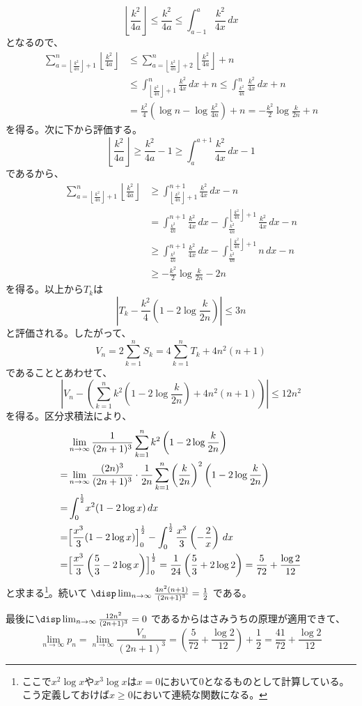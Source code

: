 \[ \left\lfloor \frac{k^2}{4a}\right\rfloor \le \frac{k^2}{4a} \le \int_{a-1}^a\! \frac{k^2}{4x} \,dx \]
となるので、
\begin{align*}
 \sum_{a=\left\lfloor\frac{k^2}{4n}\right\rfloor+1}^n \left\lfloor\frac{k^2}{4a}\right\rfloor &\le \sum_{a=\left\lfloor\frac{k^2}{4n}\right\rfloor+2}^n \left\lfloor\frac{k^2}{4a}\right\rfloor + n \\
 &\le \int_{\left\lfloor\frac{k^2}{4n}\right\rfloor+1}^n\frac{k^2}{4x}\,dx + n \le \int_{\frac{k^2}{4n}}^n\frac{k^2}{4x}\,dx + n \\
 &= \frac{k^2}{4}\left(\log n-\log\frac{k^2}{4n}\right)+n = -\frac{k^2}{2}\log\frac{k}{2n}+n
\end{align*}
を得る。次に下から評価する。
\[ \left\lfloor\frac{k^2}{4a}\right\rfloor\ge \frac{k^2}{4a}-1 \ge \int_a^{a+1}\!\frac{k^2}{4x}\,dx -1 \]
であるから、
\begin{align*}
 \sum_{a=\left\lfloor\frac{k^2}{4n}\right\rfloor+1}^n\left\lfloor\frac{k^2}{4a}\right\rfloor &\ge \int_{\left\lfloor\frac{k^2}{4n}\right\rfloor+1}^{n+1}\frac{k^2}{4x}\,dx -n \\
 &=\int_{\frac{k^2}{4n}}^{n+1}\frac{k^2}{4x}\,dx -\int_{\frac{k^2}{4n}}^{\left\lfloor\frac{k^2}{4n}\right\rfloor+1}\frac{k^2}{4x}\,dx -n \\
 &\ge\int_{\frac{k^2}{4n}}^{n+1}\frac{k^2}{4x}\,dx -\int_{\frac{k^2}{4n}}^{\left\lfloor\frac{k^2}{4n}\right\rfloor+1}n\,dx -n \\
 &\ge -\frac{k^2}{2}\log\frac{k}{2n}-2n
\end{align*}
を得る。以上から$T_k$は
\[ \left|T_k-\frac{k^2}{4}\left(1-2\log\frac{k}{2n}\right)\right| \le 3n \]
と評価される。したがって、
\[ V_n=2\sum_{k=1}^nS_k=4\sum_{k=1}^nT_k+4n^2(n+1) \]
であることとあわせて、
\[ \left|V_n-\left(\sum_{k=1}^nk^2\left(1-2\log\frac{k}{2n}\right)+4n^2(n+1)\right)\right| \le 12n^2 \]
を得る。区分求積法により、
\begin{align*}
 &\lim_{n\to\infty}\frac{1}{(2n+1)^3}\sum_{k=1}^nk^2\left(1-2\log\frac{k}{2n}\right) \\
 =& \lim_{n\to\infty}\frac{(2n)^3}{(2n+1)^3}\cdot\frac{1}{2n}\sum_{k=1}^n\left(\frac{k}{2n}\right)^2\left(1-2\log\frac{k}{2n}\right) \\
 =& \int_0^{\frac{1}{2}}\! x^2(1-2\log x) \,dx \\
 =& \Bigl[\frac{x^3}{3}(1-2\log x)\Bigr]^{\frac{1}{2}}_0-\int_0^{\frac{1}{2}}\frac{x^3}{3}\left(-\frac{2}{x}\right) \,dx \\
 =& \Bigl[\frac{x^3}{3}\left(\frac{5}{3}-2\log x\right)\Bigr]^{\frac{1}{2}}_0 = \frac{1}{24}\left(\frac{5}{3}+2\log 2\right)=\frac{5}{72}+\frac{\log 2}{12}
\end{align*}
と求まる\footnote{ここで$x^2\log x$や$x^3\log x$は$x=0$において0となるものとして計算している。こう定義しておけば$x\ge 0$において連続な関数になる。}。続いて $\disp \lim_{n\to\infty}\frac{4n^2(n+1)}{(2n+1)^3}=\frac{1}{2}$ である。

最後に$\disp \lim_{n\to\infty}\frac{12n^2}{(2n+1)^3}=0$ であるからはさみうちの原理が適用できて、
\[ \lim_{n\to\infty}p_n=\lim_{n\to\infty}\frac{V_n}{(2n+1)^3}=\left(\frac{5}{72}+\frac{\log 2}{12}\right)+\frac{1}{2}=\frac{41}{72}+\frac{\log 2}{12} \]